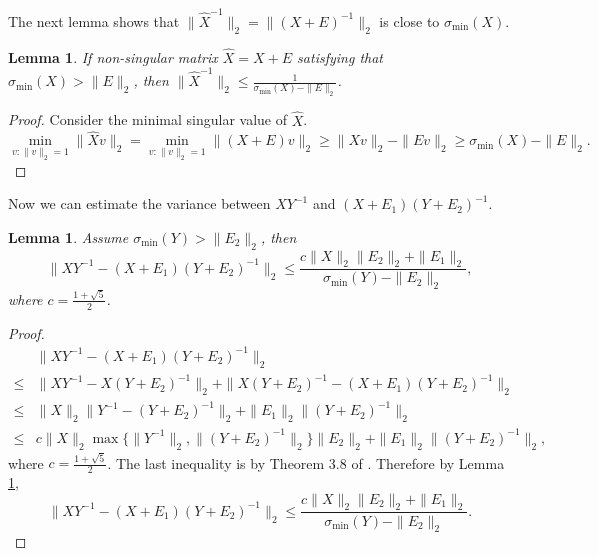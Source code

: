 \documentclass[english]{article} %
\providecommand{\lemmaname}{Lemma}
\providecommand{\lemmaname}{Lemma}
\theoremstyle{plain}
\theoremstyle{remark}
\theoremstyle{claim}
\theoremstyle{plain}
\newtheorem{lemma}[thm]{\protect\lemmaname}
\begin{document}
The next lemma shows that $\|\widehat{X}^{-1}\|_2 = \|(X+E)^{-1}\|_2$ is close to $\sigma_{\min}(X)$.

\begin{lemma}
\label{lem:inversevariation}
If non-singular matrix $\widehat{X} = X+E$ satisfying that $\sigma_{\min}(X)>\|E\|_2$, then  $\|\widehat{X}^{-1}\|_2 \le \frac{1}{\sigma_{\min}(X)-\|E\|_2}$.
\end{lemma} 
\begin{proof}
Consider the minimal singular value of $\widehat{X}$. 
\[
 \min_{v:\|v\|_2=1} \|\widehat{X}v\|_2 = \min_{v:\|v\|_2=1}\|(X+E)v\|_2 \ge \|Xv\|_2 - \|Ev\|_2 \ge \sigma_{\min}(X) - \|E\|_2.
\]
\end{proof}

Now we can estimate the variance between $XY^{-1}$ and $(X+E_1)(Y+E_2)^{-1}$.
\begin{lemma}
\label{lem:Mvariation}
Assume $\sigma_{\min}(Y) > \|E_2\|_2$, then 
\[
\| XY^{-1} - (X+E_1)(Y+E_2)^{-1}\|_2 \le \frac{c\|X\|_2\|E_2\|_2+\|E_1\|_2}{\sigma_{\min}(Y) - \|E_2\|_2},
\]
where $c = \frac{1+\sqrt{5}}{2}$.
\end{lemma}
\begin{proof}

\begin{align*}
	& \| XY^{-1} - (X+E_1)(Y+E_2)^{-1}\|_2 \\
\le & \| XY^{-1} - X(Y+E_2)^{-1}\|_2 + \| X(Y+E_2)^{-1} - (X+E_1)(Y+E_2)^{-1}\|_2 \\
\le & \|X\|_2\| Y^{-1} - (Y+E_2)^{-1}\|_2 + \| E_1\|_2 \|(Y+E_2)^{-1}\|_2 \\
\le & c \|X\|_2 \max\{\| Y^{-1}\|_2 , \|(Y+E_2)^{-1}\|_2\} \|E_2\|_2 + \| E_1\|_2 \|(Y+E_2)^{-1}\|_2,
\end{align*}
where $c = \frac{1+\sqrt{5}}{2}$. The last inequality is by Theorem 3.8 of \citep*{stewart1990matrix}. Therefore by Lemma \ref{lem:inversevariation},
\[
\| XY^{-1} - (X+E_1)(Y+E_2)^{-1}\|_2 \le \frac{c\|X\|_2\|E_2\|_2+\|E_1\|_2}{\sigma_{\min}(Y) - \|E_2\|_2}.
\]
\end{proof}
\end{document}
